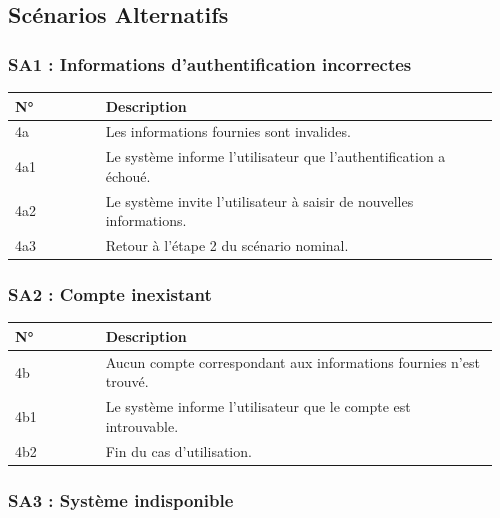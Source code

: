 \hypertarget{scuxe9narios-alternatifs}{%
\subsection{Scénarios Alternatifs}\label{scuxe9narios-alternatifs}}

\hypertarget{sa1-informations-dauthentification-incorrectes}{%
\subsubsection{SA1 : Informations d'authentification
incorrectes}\label{sa1-informations-dauthentification-incorrectes}}

\begin{longtable}{@{}p{0.18\linewidth}p{0.78\linewidth}@{}}
\toprule
\rowcolors{2}{gray!10}{white}
\textbf{N°} & \textbf{Description} \\
\midrule
\endhead
4a & Les informations fournies sont invalides. \\
4a1 & Le système informe l'utilisateur que l'authentification a
échoué. \\
4a2 & Le système invite l'utilisateur à saisir de nouvelles
informations. \\
4a3 & Retour à l'étape 2 du scénario nominal. \\
\bottomrule
\end{longtable}

\hypertarget{sa2-compte-inexistant}{%
\subsubsection{SA2 : Compte inexistant}\label{sa2-compte-inexistant}}

\begin{longtable}{@{}p{0.18\linewidth}p{0.78\linewidth}@{}}
\toprule
\rowcolors{2}{gray!10}{white}
\textbf{N°} & \textbf{Description} \\
\midrule
\endhead
4b & Aucun compte correspondant aux informations fournies n'est
trouvé. \\
4b1 & Le système informe l'utilisateur que le compte est introuvable. \\
4b2 & Fin du cas d'utilisation. \\
\bottomrule
\end{longtable}

\hypertarget{sa3-systuxe8me-indisponible}{%
\subsubsection{SA3 : Système
indisponible}\label{sa3-systuxe8me-indisponible}}

